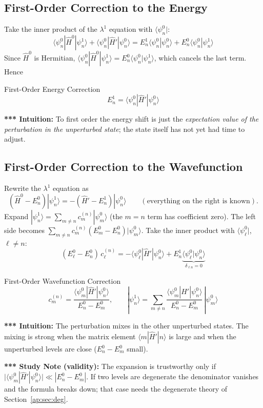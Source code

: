 \documentclass[11pt,a4paper]{article}
\begin{document}
\subsection{First-Order Correction to the Energy}
Take the inner product of the $\lambda^1$ equation with $\langle\psi_n^0|$:
\[
\langle\psi_n^0|\hat H^0|\psi_n^1\rangle + \langle\psi_n^0|\hat H'|\psi_n^0\rangle = E_n^1\langle\psi_n^0|\psi_n^0\rangle + E_n^0\langle\psi_n^0|\psi_n^1\rangle
\]
Since $\hat H^0$ is Hermitian, $\langle\psi_n^0|\hat H^0|\psi_n^1\rangle = E_n^0\langle\psi_n^0|\psi_n^1\rangle$, which cancels the last term. Hence
\begin{thm}{First-Order Energy Correction}
\[
E_n^{1} = \langle\psi_n^0|\hat H'|\psi_n^0\rangle
\]
\end{thm}
\textbf{*** Intuition:} To first order the energy shift is just the \textit{expectation value of the perturbation in the unperturbed state}; the state itself has not yet had time to adjust.

\subsection{First-Order Correction to the Wavefunction}
Rewrite the $\lambda^1$ equation as
\[
(\hat H^0 - E_n^0)|\psi_n^1\rangle = -(\hat H' - E_n^1)|\psi_n^0\rangle \qquad (\text{everything on the right is known}).
\]
Expand $|\psi_n^1\rangle = \sum_{m\ne n} c_m^{(n)}|\psi_m^0\rangle$ (the $m=n$ term has coefficient zero). The left side becomes $\sum_{m\ne n} c_m^{(n)}(E_m^0 - E_n^0)|\psi_m^0\rangle$. Take the inner product with $\langle\psi_\ell^0|$, $\ell\neq n$:
\[
(E_\ell^0 - E_n^0)\,c_\ell^{(n)} = -\langle\psi_\ell^0|\hat H'|\psi_n^0\rangle + E_n^1\underbrace{\langle\psi_\ell^0|\psi_n^0\rangle}_{\delta_{\ell n}=0}
\]
\begin{thm}{First-Order Wavefunction Correction}
\[
c_m^{(n)} = \frac{\langle\psi_m^0|\hat H'|\psi_n^0\rangle}{E_n^0 - E_m^0}, \qquad
|\psi_n^1\rangle = \sum_{m\ne n}\frac{\langle\psi_m^0|\hat H'|\psi_n^0\rangle}{E_n^0 - E_m^0}\,|\psi_m^0\rangle
\]
\end{thm}
\textbf{*** Intuition:} The perturbation mixes in the other unperturbed states. The mixing is strong when the matrix element $\langle m|\hat H'|n\rangle$ is large and when the unperturbed levels are close ($E_n^0 - E_m^0$ small).

\textbf{*** Study Note (validity):} The expansion is trustworthy only if $\big|\langle\psi_m^0|\hat H'|\psi_n^0\rangle\big| \ll |E_n^0 - E_m^0|$. If two levels are degenerate the denominator vanishes and the formula breaks down; that case needs the degenerate theory of Section~\ref{ap:sec:deg}.
\end{document}
